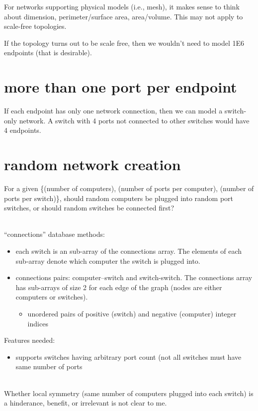 \documentclass[pdftex]{article}
\begin{document}
For networks supporting physical models (i.e., mesh), it makes sense to think about dimension, perimeter/surface area, area/volume. This may not apply to scale-free topologies. 

If the topology turns out to be scale free, then we wouldn't need to model 1E6 endpoints (that is desirable).

\section{more than one port per endpoint}

If each endpoint has only one network connection, then we can model a switch-only network. A switch with 4 ports not connected to other switches would have 4 endpoints.

\section{random network creation}

For a given \{(number of computers), (number of ports per computer), (number of ports per switch)\}, should random computers be plugged into random port switches, or should random switches be connected first?

\ \\
``connections'' database methods:
\begin{itemize}
 \item each switch is an sub-array of the connections array. The elements of each sub-array denote which computer the switch is plugged into. 
 \item connections pairs: computer--switch and switch-switch. The connections array has sub-arrays of size 2 for each edge of the graph (nodes are either computers or switches).
 \begin{itemize}
  \item unordered pairs of positive (switch) and negative (computer) integer indices
 \end{itemize}

\end{itemize}
Features needed:
 \begin{itemize}
  \item supports switches having arbitrary port count (not all switches must have same number of ports
 \end{itemize}


\ \\
Whether local symmetry (same number of computers plugged into each switch) is a hinderance, benefit, or irrelevant is not clear to me.
\end{document}
